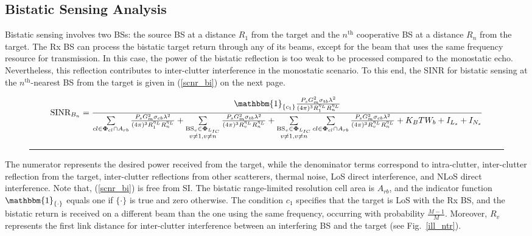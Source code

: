 \documentclass[journal]{IEEEtran}
\begin{document}
\subsection{Bistatic Sensing Analysis}
Bistatic sensing involves two BSs: the source BS at a distance \( R_1 \) from the target and the \( n^\text{th} \) cooperative BS at a distance \( R_n \) from the target.
The Rx BS can process the bistatic target return through any of its beams, except for the beam that uses the same frequency resource for transmission. In this case, the power of the bistatic reflection is too weak to be processed compared to the monostatic echo. Nevertheless, this reflection contributes to inter-clutter interference in the monostatic scenario.
 To this end, the SINR for bistatic sensing at the \( n^\text{th} \)-nearest BS from the target is given in (\ref{scnr_bi}) on the next page.
\begin{figure*}
\begin{equation}\label{scnr_bi}
\text{SINR}_{B_n}=\frac{\mathbbm{1}_{\{c_1\}}\frac{P_s  G_{m}^2 \sigma_{tb}  \lambda^2  }{(4\pi)^3 R_1^{\eta_L}  R_n^{\eta_L}}}{\sum\limits_{cl\in \bold\Phi_{cl}\cap A_{rb}}\frac{P_s G_{m}^2 \sigma_{cb} \lambda^2 }{(4\pi)^3 R_1^{\eta_L}  R_n^{\eta_L}}+\sum\limits_{\substack{\text{BS}_{v}\in \bold\Phi_{L_{IC}}\\ v \neq 1, v \neq n}}\frac{P_s  G_{m}^2 \sigma_{tb}  \lambda^2  }{(4\pi)^3 R_v^{\eta_L}  R_n^{\eta_L}}+\sum\limits_{\substack{\text{BS}_{v}\in \bold\Phi_{L_{IC}}\\ v \neq 1, v \neq n}}\sum\limits_{cl\in \bold\Phi_{cl}\cap A_{rb}}\frac{P_s  G_{m}^2 \sigma_{cb}  \lambda^2  }{(4\pi)^3 R_v^{\eta_L}  R_n^{\eta_L}}+K_B T W_b+I_{L_s}+I_{N_s} }
\end{equation}
\hrule
\end{figure*}
The numerator represents the desired power received from the target, while the denominator terms correspond to intra-clutter, inter-clutter reflection from the target, inter-clutter reflections from other scatterers, thermal noise, LoS direct interference, and NLoS direct interference. Note that, (\ref{scnr_bi}) is free from SI. 
The bistatic range-limited resolution cell area is \( A_{rb} \), and the indicator function \( \mathbbm{1}_{\{\cdot\}} \) equals one if \( \{\cdot\} \) is true and zero otherwise. The condition \( c_1 \) specifies that the target is LoS with the Rx BS, and the bistatic return is received on a different beam than the one using the same frequency, occurring with probability \( \frac{M-1}{M} \). Moreover, \( R_v \) represents the first link distance for inter-clutter interference between an interfering BS and the target (see Fig.~\ref{ill_ntr}).
\end{document}
